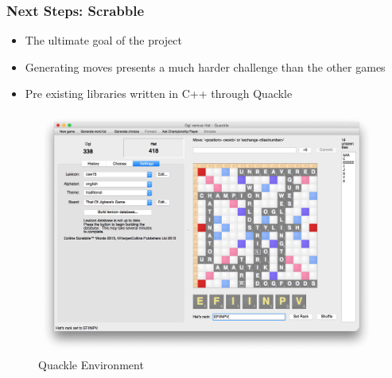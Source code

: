 \documentclass{beamer}
\begin{document}
\begin{frame}
  \frametitle{Next Steps: Scrabble}

  \begin{itemize}
    \item The ultimate goal of the project
    \item Generating moves presents a much harder challenge than the other games
    \item Pre existing libraries written in C++ through Quackle
  \end{itemize}
  \begin{figure}
    \includegraphics[width=0.5\linewidth]{./images/quackle.png}
    \caption{Quackle Environment}
  \end{figure}
\end{frame}


\end{document}
